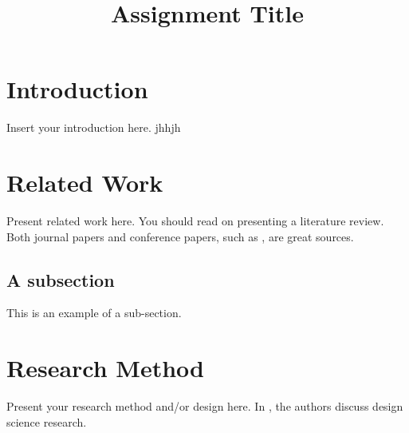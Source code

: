 \documentclass[fleqn,10pt]{wlscirep}
\title{Assignment Title}
\author{}
\begin{document}





\flushbottom
\maketitle


\section{Introduction}
Insert your introduction here. jhhjh

\section{Related Work}
Present related work here. 
You should read \cite{Webster2002-pw} on presenting a literature review.
Both journal papers and conference papers, such as \cite{Dingsoyr2014-xt}, are great sources.

\subsection{A subsection}
This is an example of a sub-section.

\section{Research Method}
Present your research method and/or design here. 
In \cite{Hevner2010-yw}, the authors discuss design science research.
\end{document}
